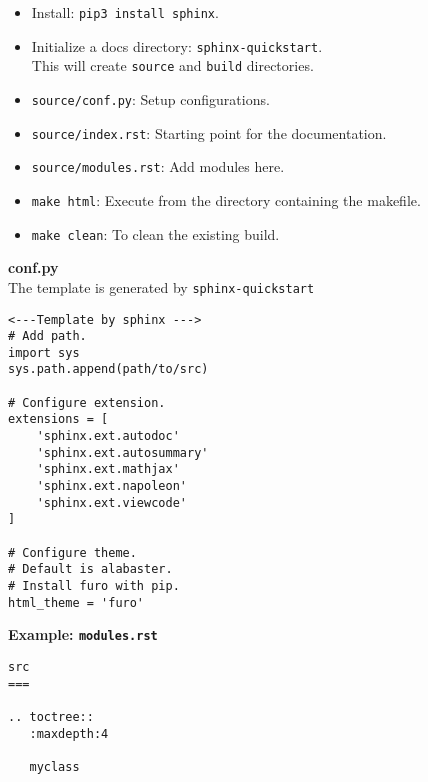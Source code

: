 \begin{itemize}
\item Install: \texttt{pip3 install sphinx}.\\
\item Initialize a docs directory: \texttt{sphinx-quickstart}.\\
        This will create \texttt{source} and \texttt{build} directories.\\
\item \texttt{source/conf.py}: Setup configurations.\\
\item \texttt{source/index.rst}: Starting point for the documentation.\\
\item \texttt{source/modules.rst}: Add modules here.\\
\item \texttt{make html}: Execute from the directory containing the makefile.\\
\item \texttt{make clean}: To clean the existing build.\\
\end{itemize}

\textbf{conf.py}\\
The template is generated by \texttt{sphinx-quickstart}\\
\begin{mdframed}[backgroundcolor=gray!10,linecolor=Firebrick4]
\begin{verbatim}
<---Template by sphinx --->
# Add path.
import sys
sys.path.append(path/to/src)

# Configure extension.
extensions = [
    'sphinx.ext.autodoc'
    'sphinx.ext.autosummary'
    'sphinx.ext.mathjax'
    'sphinx.ext.napoleon'
    'sphinx.ext.viewcode'
]

# Configure theme.
# Default is alabaster.
# Install furo with pip.
html_theme = 'furo' 
\end{verbatim}
\end{mdframed}

\columnbreak

\textbf{Example: \texttt{modules.rst}}
\begin{mdframed}[backgroundcolor=gray!10,linecolor=Firebrick4]
\begin{verbatim}
src
===

.. toctree::
   :maxdepth:4

   myclass
\end{verbatim}
\end{mdframed}



